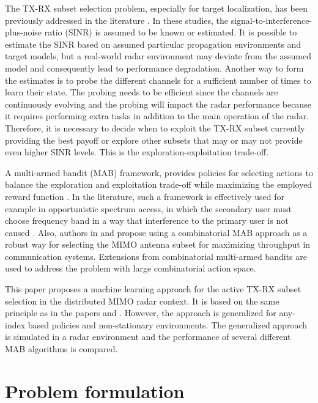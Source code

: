 \documentclass[conference]{IEEEtran}
\begin{document}
The TX-RX subset selection problem, especially for target localization, has been previously addressed in the literature \cite{Godrich2011, Sun2014}.
In these studies, the signal-to-interference-plus-noise ratio (SINR) is assumed to be known or estimated.
It is possible to estimate the SINR based on assumed particular propagation environments and target models, but a real-world radar environment may deviate from the assumed model and consequently lead to performance degradation.
Another way to form the estimates is to probe the different channels for a sufficient number of times to learn their state. 
The probing needs to be efficient since the channels are continuously evolving and the probing will impact the radar performance because it requires performing extra tasks in addition to the main operation of the radar.  Therefore, it is necessary to decide when to exploit the TX-RX subset currently providing the best payoff or explore other subsets that may or may not provide even higher SINR levels. 
This is the exploration-exploitation trade-off.

A multi-armed bandit (MAB) framework, provides policies for selecting actions to balance the exploration and exploitation trade-off while maximizing the employed reward function \cite{Lattimore2019}.
In the literature, such a framework is effectively used for example in opportunistic spectrum access, in which the secondary user must choose frequency band in a way that interference to the primary user is not caused \cite{Zhao2008}.
Also, authors in \cite{Mukherjee2012} and \cite{Kuai2019} propose using a combinatorial MAB approach as a robust way for selecting the MIMO antenna subset for maximizing throughput in communication systems.
Extensions from combinatorial multi-armed bandits are used to address the problem with large combinatorial action space.

This paper proposes a machine learning approach for the active TX-RX subset selection in the distributed MIMO radar context.
It is based on the same principle as in the papers \cite{Mukherjee2012} and \cite{Kuai2019}. 
However, the approach is generalized for any-index based policies and non-stationary environments. 
The generalized approach is simulated in a radar environment and the performance of several different MAB algorithms is compared.


\section{Problem formulation}
\end{document}
